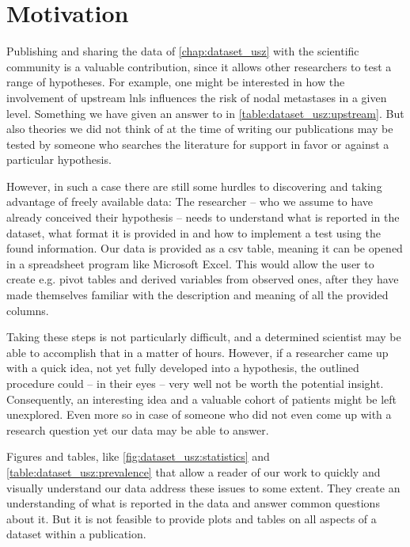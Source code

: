 \documentclass[\relativeRoot/main.tex]{subfiles}
\begin{document}
\section{Motivation}
\label{sec:lyprox:motivation}

Publishing and sharing the data of \cref{chap:dataset_usz} with the scientific community is a valuable contribution, since it allows other researchers to test a range of hypotheses. For example, one might be interested in how the involvement of upstream \glspl{lnl} influences the risk of nodal metastases in a given level. Something we have given an answer to in \cref{table:dataset_usz:upstream}. But also theories we did not think of at the time of writing our publications \cite{ludwig_detailed_2021,ludwig_dataset_2021} may be tested by someone who searches the literature for support in favor or against a particular hypothesis.

However, in such a case there are still some hurdles to discovering and taking advantage of freely available data: The researcher -- who we assume to have already conceived their hypothesis -- needs to understand what is reported in the dataset, what format it is provided in and how to implement a test using the found information. Our data is provided as a \gls{csv} table, meaning it can be opened in a spreadsheet program like Microsoft Excel. This would allow the user to create e.g. pivot tables and derived variables from observed ones, after they have made themselves familiar with the description and meaning of all the provided columns.

Taking these steps is not particularly difficult, and a determined scientist may be able to accomplish that in a matter of hours. However, if a researcher came up with a quick idea, not yet fully developed into a hypothesis, the outlined procedure could -- in their eyes -- very well not be worth the potential insight. Consequently, an interesting idea and a valuable cohort of patients might be left unexplored. Even more so in case of someone who did not even come up with a research question yet our data may be able to answer.

Figures and tables, like \cref{fig:dataset_usz:statistics} and \cref{table:dataset_usz:prevalence} that allow a reader of our work to quickly and visually understand our data address these issues to some extent. They create an understanding of what is reported in the data and answer common questions about it. But it is not feasible to provide plots and tables on all aspects of a dataset within a publication.
\end{document}
